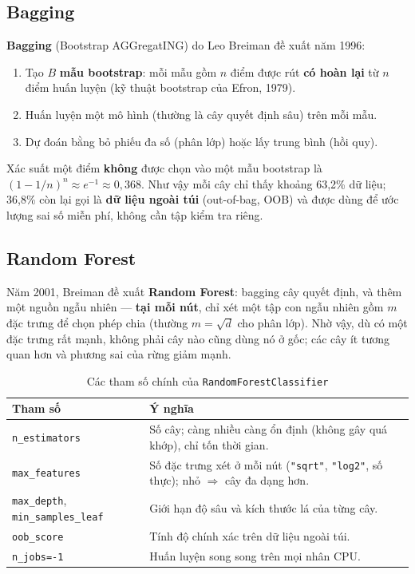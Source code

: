 \subsection{Bagging}

\textbf{Bagging} (Bootstrap AGGregatING) do Leo Breiman đề xuất năm 1996:
\begin{enumerate}
    \item Tạo $B$ \textbf{mẫu bootstrap}: mỗi mẫu gồm $n$ điểm được rút \textbf{có hoàn lại} từ $n$ điểm huấn luyện (kỹ thuật bootstrap của Efron, 1979).
    \item Huấn luyện một mô hình (thường là cây quyết định sâu) trên mỗi mẫu.
    \item Dự đoán bằng bỏ phiếu đa số (phân lớp) hoặc lấy trung bình (hồi quy).
\end{enumerate}
Xác suất một điểm \textbf{không} được chọn vào một mẫu bootstrap là $(1 - 1/n)^n \approx e^{-1} \approx 0{,}368$. Như vậy mỗi cây chỉ thấy khoảng 63,2\% dữ liệu; 36,8\% còn lại gọi là \textbf{dữ liệu ngoài túi} (out-of-bag, OOB) và được dùng để ước lượng sai số miễn phí, không cần tập kiểm tra riêng.

\subsection{Random Forest}

Năm 2001, Breiman đề xuất \textbf{Random Forest}: bagging cây quyết định, và thêm một nguồn ngẫu nhiên --- \textbf{tại mỗi nút}, chỉ xét một tập con ngẫu nhiên gồm $m$ đặc trưng để chọn phép chia (thường $m = \sqrt{d}$ cho phân lớp). Nhờ vậy, dù có một đặc trưng rất mạnh, không phải cây nào cũng dùng nó ở gốc; các cây ít tương quan hơn và phương sai của rừng giảm mạnh.

\begin{table}[H]
\centering
\begin{tabular}{|l|p{9.2cm}|}
\hline
\textbf{Tham số} & \textbf{Ý nghĩa} \\
\hline
\texttt{n\_estimators} & Số cây; càng nhiều càng ổn định (không gây quá khớp), chỉ tốn thời gian. \\ \hline
\texttt{max\_features} & Số đặc trưng xét ở mỗi nút (\texttt{"sqrt"}, \texttt{"log2"}, số thực); nhỏ $\Rightarrow$ cây đa dạng hơn. \\ \hline
\texttt{max\_depth}, \texttt{min\_samples\_leaf} & Giới hạn độ sâu và kích thước lá của từng cây. \\ \hline
\texttt{oob\_score} & Tính độ chính xác trên dữ liệu ngoài túi. \\ \hline
\texttt{n\_jobs=-1} & Huấn luyện song song trên mọi nhân CPU. \\ \hline
\end{tabular}
\caption{Các tham số chính của \texttt{RandomForestClassifier}}
\end{table}

